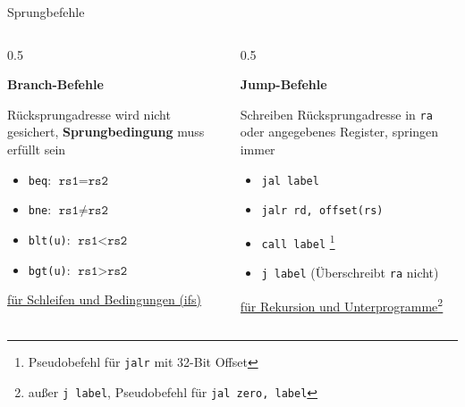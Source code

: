 \begin{frame}[c, fragile]{Sprungbefehle}{}
	\vspace{-0.5cm}
	\begin{columns}
		\begin{column}{0.5\textwidth}
			\begin{center}\textbf{Branch-Befehle}\end{center}
			Rücksprungadresse wird nicht gesichert, \textbf{Sprungbedingung}
			muss erfüllt sein
			\vspace{0.5\baselineskip}
			\begin{itemize}
				\item \verb|beq|: $\texttt{rs1} = \texttt{rs2}$
				\item \verb|bne|: $\texttt{rs1} \ne \texttt{rs2}$
				\item \verb|blt(u)|: $\texttt{rs1} < \texttt{rs2}$
				\item \verb|bgt(u)|: $\texttt{rs1} > \texttt{rs2}$
			\end{itemize}
			\begin{center}
				\underline{für Schleifen und Bedingungen (ifs)}
			\end{center}
		\end{column}
		\begin{column}{0.5\textwidth}
			\begin{center}\textbf{Jump-Befehle}\end{center}
			Schreiben Rücksprungadresse in \texttt{ra} oder angegebenes Register,
			springen immer
			\vspace{0.5\baselineskip}
			\begin{itemize}
				\item \verb|jal label|
				\item \verb|jalr rd, offset(rs)|
				\item \verb|call label| \footnote[frame]{Pseudobefehl für \texttt{jalr} mit 32-Bit Offset}
				\item \verb|j label| (Überschreibt \texttt{ra} nicht)
			\end{itemize}
			\begin{center}
				\underline{für Rekursion und Unterprogramme\footnote[frame]{außer \texttt{j label}, Pseudobefehl für \texttt{jal zero, label}}}
			\end{center}
		\end{column}
	\end{columns}
\end{frame}

